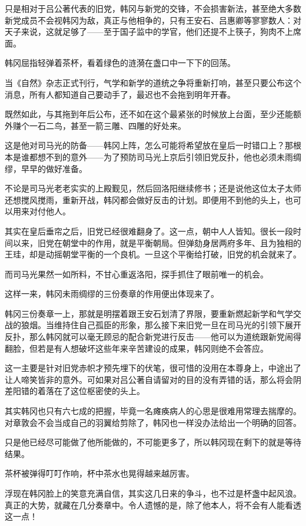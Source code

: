 只是相对于吕公著代表的旧党，韩冈与新党的交锋，不会损害新法，甚至绝大多数新党成员不会视韩冈为敌，真正与他相争的，只有王安石、吕惠卿等寥寥数人：对天子来说，这就足够了——至于国子监中的学官，他们还提不上筷子，狗肉不上席面。

韩冈屈指轻弹着茶杯，看着绿色的涟漪在盏口中一下下的回荡。

当《自然》杂志正式刊行，气学和新学的道统之争将重新打响，甚至只要公布这个消息，所有人都知道自己要动手了，最迟也不会拖到明年开春。

既然如此，与其拖到年后公布，还不如在这个最紧张的时候放上台面，至少还能额外赚个一石二鸟，甚至一箭三雕、四雕的好处来。

这是他对司马光的防备——韩冈上阵，怎么可能将希望放在皇后一时错口上？那根本是谁都想不到的意外——为了预防司马光上京后引领旧党反扑，他也必须未雨绸缪，早早的做好准备。

不论是司马光老老实实的上殿觐见，然后回洛阳继续修书；还是说他这位太子太师还想搅风搅雨，重新开战，韩冈都会做好反击的计划。即便用不到他的头上，也可以用来对付他人。

其实在皇后垂帘之后，旧党已经很难翻身了。这一点，朝中人人皆知。很长一段时间以来，旧党在朝堂中的作用，就是平衡朝局。但弹劾身居两府多年、且为独相的王珪，却是动摇朝堂平衡的一个良机。一旦这个平衡给打破，旧党的机会就来了。

而司马光果然一如所料，不甘心重返洛阳，探手抓住了眼前唯一的机会。

这样一来，韩冈未雨绸缪的三份奏章的作用便出体现来了。

韩冈三份奏章一上，那就是明摆着跟王安石划清了界限，要重新燃起新学和气学交战的狼烟。当维持住自己孤臣的形象，那么接下来旧党一旦在司马光的引领下展开反扑，那么韩冈就可以毫无顾忌的配合新党进行反击——他可以为道统跟新党闹得翻脸，但若是有人想破坏这些年来辛苦建设的成果，韩冈则绝不会答应。

这一主要是针对旧党赤帜才预先埋下的伏笔，很可惜的没用在本尊身上，中途出了让人啼笑皆非的意外。可如果对吕公著自请留对的目的没有弄错的话，那么将会阴差阳错的着落在了这位枢密使的头上。

其实韩冈也只有六七成的把握，毕竟一名瘫痪病人的心思是很难用常理去揣摩的。对章敦会不会当成自己的羽翼给剪除了，韩冈也一样没办法给出一个明确的回答。

只是他已经尽可能做了他所能做的，不可能更多了，所以韩冈现在剩下的就是等待结果。

茶杯被弹得叮叮作响，杯中茶水也晃得越来越厉害。

浮现在韩冈脸上的笑意充满自信，其实这几日来的争斗，也不过是杯盏中起风浪。真正的大势，就藏在几分奏章中。令人遗憾的是，除了他本人，将不会有人能看透这一点！
